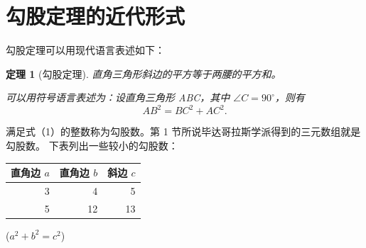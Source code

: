 \documentclass[UTF8]{ctexart}
\newtheorem{thm}{定理}
\begin{document}
\section{勾股定理的近代形式}
勾股定理可以用现代语言表述如下：
\begin{thm}[勾股定理]
直角三角形斜边的平方等于两腰的平方和。

可以用符号语言表述为：设直角三角形 ABC，其中 $\angle C = 90^\circ$，则有
\begin{equation}
  AB^2 = BC^2 + AC^2.
\end{equation}
\end{thm}

满足式（1）的整数称为勾股数。第 1 节所说毕达哥拉斯学派得到的三元数组就是勾股数。
下表列出一些较小的勾股数：
\begin{table}[H]
\begin{tabular}{|rrr|}
\hline
直角边 $a$ & 直角边 $b$ & 斜边 $c$\\
\hline
3 & 4 & 5 \\
5 & 12 & 13 \\
\hline
\end{tabular}%
\qquad
($a^2 + b^2 = c^2$)
\end{table}

\end{document}
